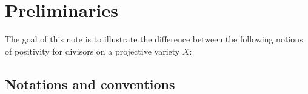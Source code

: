 \section{Preliminaries}


  The goal of this note is to illustrate the difference between the following notions of positivity for divisors on a projective variety $X$:
  \begin{center}
  \end{center}
  

\subsection{Notations and conventions}

